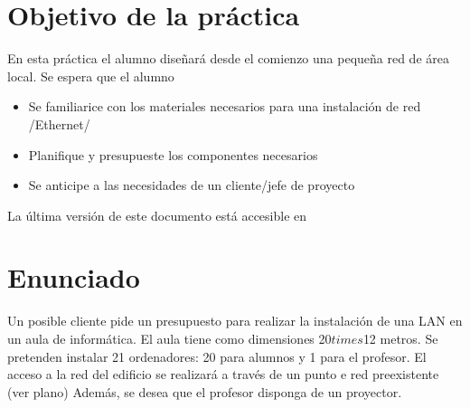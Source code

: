 
\usepackage{eurosym}


\setlength{\parindent}{1em}


\renewcommand{\hmwkTitle}{Cableado de aula}
\renewcommand{\hmwkClass}{Planificación y Administración de Redes}

\usepackage{blindtext}






\primerapagina

\section{Objetivo de la práctica}
En esta práctica el alumno diseñará desde el comienzo una pequeña red de área local. Se espera que el alumno
\begin{itemize}
\item Se familiarice con los materiales necesarios para una instalación de red /Ethernet/
\item Planifique y presupueste los componentes necesarios
\item Se anticipe a las necesidades de un cliente/jefe de proyecto
\end{itemize}


La última versión de este documento está accesible en 

\section{Enunciado}
Un posible cliente pide un presupuesto para realizar la instalación de una LAN en un aula de informática.
El aula tiene como dimensiones 20$times$12 metros. Se pretenden instalar 21 ordenadores: 20 para alumnos y 1 para el profesor. El acceso a la red del edificio se realizará a través de un punto e red preexistente (ver plano) Además, se desea que el profesor disponga de un proyector.

